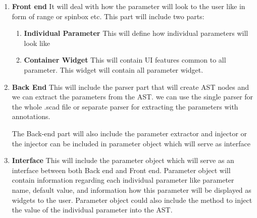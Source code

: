 \begin{enumerate}
    \item \textbf{Front end}
    It will deal with how the parameter will look to the user like in form of range or spinbox etc. This part will include two parts:
    \begin{enumerate}
        \item \textbf{Individual Parameter}
        This will define how individual parameters will look like
        \item \textbf{Container Widget}
        This will contain UI features common to all parameter. This widget will contain all parameter widget.
       
    \end{enumerate}
   
    \item \textbf{Back End}
    This will include the parser part that will create AST nodes and we can extract the parameters from the AST. we can use the single parser for the whole .scad file or separate parser for extracting the parameters with annotations.
   
    The Back-end part will also include the parameter extractor and injector or the injector can be included in parameter object which will serve as interface
    \item \textbf{Interface}
    This will include the parameter object which will serve as an interface between both Back end and Front end. Parameter object will contain information regarding each individual parameter like parameter name, default value, and information how this parameter will be displayed as widgets to the user. Parameter object could also include the method to inject the value of the individual parameter into the AST.
   
\end{enumerate}

